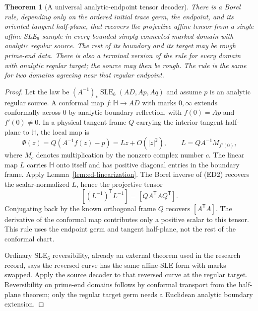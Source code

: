 \documentclass[11pt]{article}
\newtheorem{theorem}{Theorem}[section]
\theoremstyle{definition}\newtheorem{definition}[theorem]{Definition}
\theoremstyle{remark}\newtheorem{remark}[theorem]{Remark}
\begin{document}
\begin{theorem}[A universal analytic-endpoint tensor decoder]
\label{thm:ed-analytic}
There is a Borel rule, depending only on the ordered initial trace germ,
the endpoint, and its oriented tangent half-plane, that recovers the
projective affine tensor from a single affine-SLE$_6$ sample in every
bounded simply connected marked domain with analytic regular source.
The rest of its boundary and its target may be rough prime-end data.
There is also a terminal version of the rule for every domain with
analytic regular target; the source may then be rough. The rule is the
same for two domains agreeing near that regular endpoint.
\end{theorem}
\begin{proof}
Let the law be
$(A^{-1})_*\operatorname{SLE}_6(AD,Ap,Aq)$ and assume $p$ is an analytic
regular source. A conformal map $f:\mathbb H\to AD$ with marks
$0,\infty$ extends conformally across $0$ by analytic boundary
reflection, with $f(0)=Ap$ and $f'(0)\ne0$. In a physical tangent frame
$Q$ carrying the interior tangent half-plane to $\mathbb H$, the local
map is
\[
 \Phi(z)=Q(A^{-1}f(z)-p)=Lz+O(|z|^2),
 \qquad L=QA^{-1}M_{f'(0)},
 \tag{ED11}
\]
where $M_c$ denotes multiplication by the nonzero complex number $c$.
The linear map $L$ carries $\mathbb H$ onto itself and has positive
diagonal entries in the boundary frame. Apply
Lemma~\ref{lem:ed-linearization}. The Borel inverse of (ED2) recovers
the scalar-normalized $L$, hence the projective tensor
\[
 [(L^{-1})^{\mathsf T}L^{-1}]
       =[QA^{\mathsf T}AQ^{\mathsf T}].
 \tag{ED12}
\]
Conjugating back by the known orthogonal frame $Q$ recovers
$[A^{\mathsf T}A]$. The derivative of the conformal map contributes
only a positive scalar to this tensor. This rule uses the endpoint
germ and tangent half-plane, not the rest of the conformal chart.

Ordinary SLE$_6$ reversibility, already an external theorem used in the
research record, says the reversed curve has the same affine-SLE form
with marks swapped. Apply the source decoder to that reversed curve at
the regular target. Reversibility on prime-end domains follows by
conformal transport from the half-plane theorem; only the regular
target germ needs a Euclidean analytic boundary extension.
\end{proof}
\end{document}
